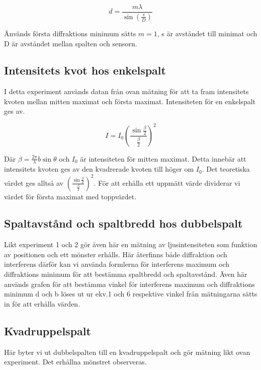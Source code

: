 \documentclass[a4paper]{article}
\begin{document}
\begin{equation}
    d = \frac{m \lambda}{\sin (\frac{s}{D})}
\end{equation}

Änvänds första diffraktions minimum sätts $m=1$, s är avståndet till minimat och D är avståndet mellan spalten och sensorn. 

\subsection{Intensitets kvot hos enkelspalt}

I detta experiment används datan från ovan mätning för att ta fram intensitets kvoten mellan mitten maximat och första maximat. Intensiteten för en enkelspalt ges av.

\begin{equation}
    I = I_0 \left ( \frac{\sin\frac{\beta}{2}}{\frac{\beta}{2}}\right )^2
\end{equation}

Där $\beta = \frac{2\pi}{\lambda}b\sin\theta$ och $I_0$ är intensiteten för mitten maximat. Detta innebär att intensitets kvoten ges av den kvadrerade kvoten till höger om $I_0$. Det teoretiska värdet ges alltså av $\left ( \frac{\sin\frac{\beta}{2}}{\frac{\beta}{2}}\right )^2$. För att erhålla ett uppmätt värde dividerar vi värdet för första maximat med toppvärdet. 

\subsection{Spaltavstånd och spaltbredd hos dubbelspalt}

Likt experiment 1 och 2 gör även här en mätning av ljusintensiteten som funktion av positionen och ett mönster erhålls. Här återfinns både diffraktion och interferens därför kan vi använda formlerna för interferens maximum och diffraktions minimum för att bestämma spaltbredd och spaltavstånd. Även här används grafen för att bestämma vinkel för interferens maximum och diffraktions minimum d och b löses ut ur ekv.1 och 6 respektive vinkel från mätningarna sätts in för att erhålla värden. 

\subsection{Kvadruppelspalt}

Här byter vi ut dubbelspalten till en kvadruppelspalt och gör mätning likt ovan experiment. Det erhållna mönstret observeras. 
\end{document}
